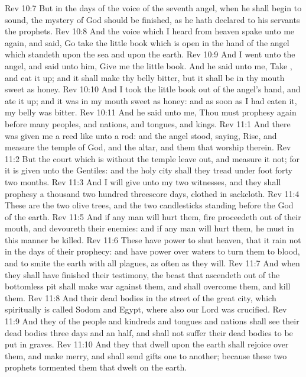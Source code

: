 \vs Rev 10:7 But in the days of the voice of the seventh angel, when he shall begin to sound, the mystery of God should be finished, as he hath declared to his servants the prophets.
\vs Rev 10:8 And the voice which I heard from heaven spake unto me again, and said, Go  take the little book which is open in the hand of the angel which standeth upon the sea and upon the earth.
\vs Rev 10:9 And I went unto the angel, and said unto him, Give me the little book. And he said unto me, Take , and eat it up; and it shall make thy belly bitter, but it shall be in thy mouth sweet as honey.
\vs Rev 10:10 And I took the little book out of the angel's hand, and ate it up; and it was in my mouth sweet as honey: and as soon as I had eaten it, my belly was bitter.
\vs Rev 10:11 And he said unto me, Thou must prophesy again before many peoples, and nations, and tongues, and kings.
\vs Rev 11:1 And there was given me a reed like unto a rod: and the angel stood, saying, Rise, and measure the temple of God, and the altar, and them that worship therein.
\vs Rev 11:2 But the court which is without the temple leave out, and measure it not; for it is given unto the Gentiles: and the holy city shall they tread under foot forty  two months.
\vs Rev 11:3 And I will give  unto my two witnesses, and they shall prophesy a thousand two hundred  threescore days, clothed in sackcloth.
\vs Rev 11:4 These are the two olive trees, and the two candlesticks standing before the God of the earth.
\vs Rev 11:5 And if any man will hurt them, fire proceedeth out of their mouth, and devoureth their enemies: and if any man will hurt them, he must in this manner be killed.
\vs Rev 11:6 These have power to shut heaven, that it rain not in the days of their prophecy: and have power over waters to turn them to blood, and to smite the earth with all plagues, as often as they will.
\vs Rev 11:7 And when they shall have finished their testimony, the beast that ascendeth out of the bottomless pit shall make war against them, and shall overcome them, and kill them.
\vs Rev 11:8 And their dead bodies  in the street of the great city, which spiritually is called Sodom and Egypt, where also our Lord was crucified.
\vs Rev 11:9 And they of the people and kindreds and tongues and nations shall see their dead bodies three days and an half, and shall not suffer their dead bodies to be put in graves.
\vs Rev 11:10 And they that dwell upon the earth shall rejoice over them, and make merry, and shall send gifts one to another; because these two prophets tormented them that dwelt on the earth.
